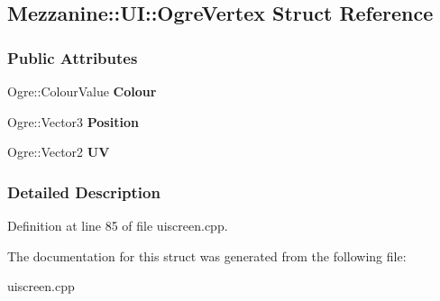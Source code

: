 \hypertarget{structMezzanine_1_1UI_1_1OgreVertex}{
\subsection{Mezzanine::UI::OgreVertex Struct Reference}
\label{structMezzanine_1_1UI_1_1OgreVertex}
}
\subsubsection*{Public Attributes}
\begin{DoxyCompactItemize}
\item 
\hypertarget{structMezzanine_1_1UI_1_1OgreVertex_a050825bb7eac75ee149ee5678bf3da01}{
Ogre::ColourValue {\bfseries Colour}}
\label{structMezzanine_1_1UI_1_1OgreVertex_a050825bb7eac75ee149ee5678bf3da01}

\item 
\hypertarget{structMezzanine_1_1UI_1_1OgreVertex_a239a28a299650c84300ceddf06163d39}{
Ogre::Vector3 {\bfseries Position}}
\label{structMezzanine_1_1UI_1_1OgreVertex_a239a28a299650c84300ceddf06163d39}

\item 
\hypertarget{structMezzanine_1_1UI_1_1OgreVertex_a209645327d095be4004859603b2900d8}{
Ogre::Vector2 {\bfseries UV}}
\label{structMezzanine_1_1UI_1_1OgreVertex_a209645327d095be4004859603b2900d8}

\end{DoxyCompactItemize}


\subsubsection{Detailed Description}


Definition at line 85 of file uiscreen.cpp.



The documentation for this struct was generated from the following file:\begin{DoxyCompactItemize}
\item 
uiscreen.cpp\end{DoxyCompactItemize}
